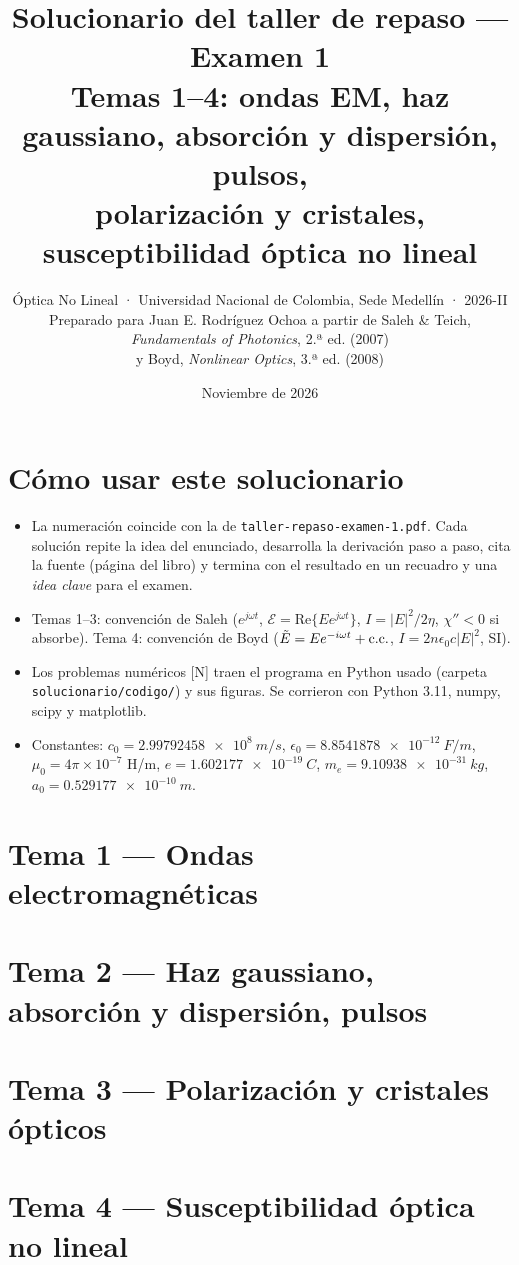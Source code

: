 \documentclass[10pt]{article}
\title{\color{tema}Solucionario del taller de repaso — Examen 1\\[2pt]\large Temas 1–4: ondas EM, haz gaussiano, absorción y dispersión, pulsos,\\ polarización y cristales, susceptibilidad óptica no lineal}
\author{Óptica No Lineal · Universidad Nacional de Colombia, Sede Medellín · 2026-II\\
\small Preparado para Juan E. Rodríguez Ochoa a partir de Saleh \& Teich, \emph{Fundamentals of Photonics}, 2.ª ed. (2007)\\
\small y Boyd, \emph{Nonlinear Optics}, 3.ª ed. (2008)}
\date{Noviembre de 2026}
\begin{document}
\maketitle
\thispagestyle{fancy}

\section*{Cómo usar este solucionario}
\begin{itemize}
\item La numeración coincide con la de \texttt{taller-repaso-examen-1.pdf}. Cada solución repite la idea del enunciado, desarrolla la derivación paso a paso, cita la fuente (página del libro) y termina con el resultado en un recuadro y una \emph{idea clave} para el examen.
\item Temas 1–3: convención de Saleh ($e^{j\omega t}$, $\mathcal E=\mathrm{Re}\{Ee^{j\omega t}\}$, $I=|E|^2/2\eta$, $\chi''<0$ si absorbe). Tema 4: convención de Boyd ($\tilde E=Ee^{-i\omega t}+\text{c.c.}$, $I=2n\epsilon_0c|E|^2$, SI).
\item Los problemas numéricos [N] traen el programa en Python usado (carpeta \texttt{solucionario/codigo/}) y sus figuras. Se corrieron con Python 3.11, numpy, scipy y matplotlib.
\item Constantes: $c_0=\SI{2.99792458e8}{m/s}$, $\epsilon_0=\SI{8.8541878e-12}{F/m}$, $\mu_0=4\pi\times10^{-7}$ H/m, $e=\SI{1.602177e-19}{C}$, $m_e=\SI{9.10938e-31}{kg}$, $a_0=\SI{0.529177e-10}{m}$.
\end{itemize}

\tableofcontents
\clearpage

\section{Tema 1 — Ondas electromagnéticas}
\clearpage
\section{Tema 2 — Haz gaussiano, absorción y dispersión, pulsos}
\clearpage
\section{Tema 3 — Polarización y cristales ópticos}
\clearpage
\section{Tema 4 — Susceptibilidad óptica no lineal}
\end{document}
